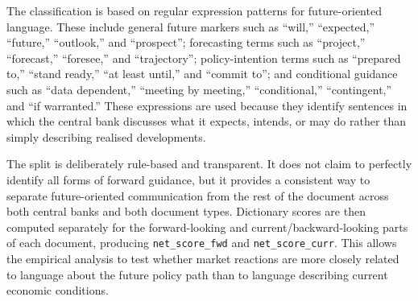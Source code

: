 The classification is based on regular expression patterns for
future-oriented language. These include general future markers such
as ``will,'' ``expected,'' ``future,'' ``outlook,'' and ``prospect'';
forecasting terms such as ``project,'' ``forecast,'' ``foresee,''
and ``trajectory''; policy-intention terms such as ``prepared to,''
``stand ready,'' ``at least until,'' and ``commit to''; and
conditional guidance such as ``data dependent,'' ``meeting by
meeting,'' ``conditional,'' ``contingent,'' and ``if warranted.''
These expressions are used because they identify sentences in which
the central bank discusses what it expects, intends, or may do
rather than simply describing realised developments.

The split is deliberately rule-based and transparent. It does not
claim to perfectly identify all forms of forward guidance, but it
provides a consistent way to separate future-oriented communication
from the rest of the document across both central banks and both
document types. Dictionary scores are then computed separately for
the forward-looking and current/backward-looking parts of each
document, producing \texttt{net\_score\_fwd} and
\texttt{net\_score\_curr}. This allows the empirical analysis to
test whether market reactions are more closely related to language
about the future policy path than to language describing current
economic conditions.

